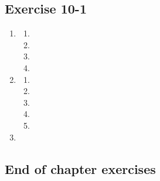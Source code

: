 \subsection{Exercise 10-1} %
  \begin{enumerate}[itemsep=5pt, label=\textbf{\arabic*}. ]
  \item %
    \begin{enumerate}[noitemsep, label=\textbf{(\alph*)} ]
    \item %
    \item %
    \item %
    \item %
    \end{enumerate}
  \item %
    \begin{enumerate}[noitemsep, label=\textbf{(\alph*)} ]
    \item %
    \item %
    \item %
    \item %
    \item %
    \end{enumerate}
\item %

\end{enumerate}

\subsection{End of chapter exercises} %

